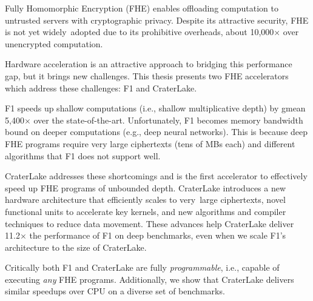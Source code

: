 Fully Homomorphic Encryption (FHE) enables offloading computation to untrusted
servers with cryptographic privacy. Despite its attractive security, FHE is not
yet widely~adopted due to its prohibitive overheads, about 10,000$\times$ over
unencrypted computation.

Hardware acceleration is an attractive approach to bridging this performance
gap, but it brings new challenges. This thesis presents two FHE accelerators
which address these challenges: F1 and CraterLake.

F1 speeds up shallow computations (i.e., shallow multiplicative depth) by gmean
5,400$\times$ over the state-of-the-art. Unfortunately, F1 becomes memory
bandwidth bound on deeper computations (e.g., deep neural networks).
This is because deep FHE programs require very large ciphertexts (tens of MBs each)
and different algorithms that F1 does not support well.

CraterLake addresses these shortcomings and is the first accelerator to
effectively speed up FHE programs of unbounded depth.  CraterLake introduces a
new hardware architecture that efficiently scales to very~large ciphertexts,
novel functional units to accelerate key kernels, and new algorithms and
compiler techniques to reduce data movement. These advances help CraterLake
deliver 11.2$\times$ the performance of F1 on deep benchmarks, even when we
scale F1's architecture to the size of CraterLake.

Critically both F1 and CraterLake are fully \emph{programmable}, i.e., capable
of executing \emph{any} FHE programs. Additionally, we show that CraterLake
delivers similar speedups over CPU on a diverse set of benchmarks.
